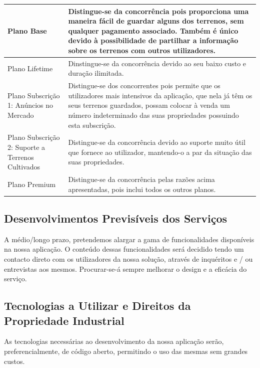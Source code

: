 \documentclass[11pt]{article}
\begin{document}
	\begin{center}
		\begin{tabularx}{\linewidth}{ | p{} | X | }
			\hline
			Plano Base & Distingue-se da concorrência pois proporciona uma maneira fácil de guardar alguns dos terrenos, sem qualquer pagamento associado. Também é único devido à possibilidade de partilhar a informação sobre os terrenos com outros utilizadores. \\
			\hline
			Plano Lifetime & Dinstingue-se da concorrência devido ao seu baixo custo e duração ilimitada. \\
			\hline
			Plano Subscrição 1: Anúncios no Mercado & Distingue-se dos concorrentes pois permite que os utilizadores mais intensivos da aplicação, que nela já têm os seus terrenos guardados, possam colocar à venda um número indeterminado das suas propriedades possuindo esta subscrição. \\
			\hline 
			Plano Subscrição 2: Suporte a Terrenos Cultivados & Distingue-se da concorrência devido ao suporte muito útil que fornece ao utilizador, mantendo-o a par da situação das suas propriedades. \\
			\hline   
			Plano Premium & Distingue-se da concorrência pelas razões acima apresentadas, pois inclui todos os outros planos.  \\
			\hline
		\end{tabularx}
	\end{center}
	
	
	\large
	\subsection{Desenvolvimentos Previsíveis dos Serviços}
	
	\normalsize
	
	A médio/longo prazo, pretendemos alargar a gama de funcionalidades disponíveis na nossa aplicação. O conteúdo dessas funcionalidades será decidido tendo um contacto direto com os utilizadores da nossa solução, através de inquéritos e / ou entrevistas aos mesmos. Procurar-se-á sempre melhorar o design e a eficácia do serviço.
	
	
	\large
	\subsection{Tecnologias a Utilizar e Direitos da Propriedade Industrial}
	
	\normalsize
	
	As tecnologias necessárias ao desenvolvimento da nossa aplicação serão, preferencialmente, de código aberto, permitindo o uso das mesmas sem grandes custos.
	
\end{document}

